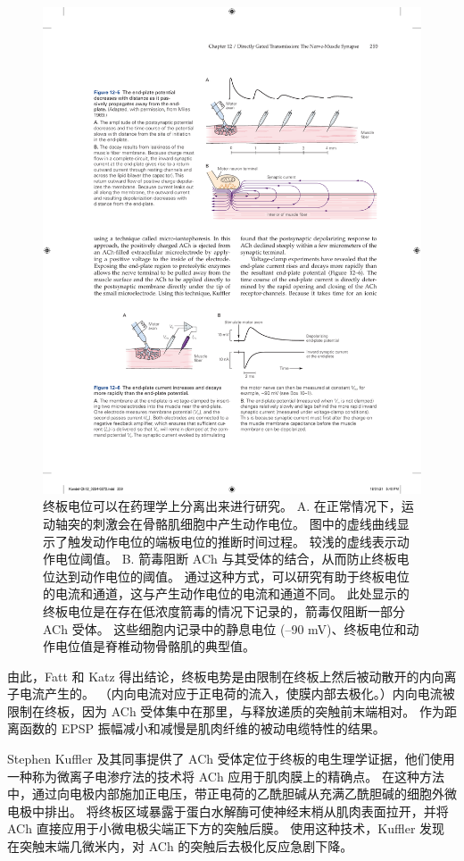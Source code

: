 \begin{figure}[htbp]
	\centering
	\includegraphics[width=0.8\linewidth]{chap12/fig_12_4}
	\caption{终板电位可以在药理学上分离出来进行研究。 A. 在正常情况下，运动轴突的刺激会在骨骼肌细胞中产生动作电位。 图中的虚线曲线显示了触发动作电位的端板电位的推断时间过程。 较浅的虚线表示动作电位阈值。 B. 箭毒阻断 ACh 与其受体的结合，从而防止终板电位达到动作电位的阈值。 通过这种方式，可以研究有助于终板电位的电流和通道，这与产生动作电位的电流和通道不同。 此处显示的终板电位是在存在低浓度箭毒的情况下记录的，箭毒仅阻断一部分 ACh 受体。 这些细胞内记录中的静息电位 (–90 mV)、终板电位和动作电位值是脊椎动物骨骼肌的典型值。}
	\label{fig:12_4}
\end{figure}


由此，Fatt 和 Katz 得出结论，终板电势是由限制在终板上然后被动散开的内向离子电流产生的。 
（内向电流对应于正电荷的流入，使膜内部去极化。）内向电流被限制在终板，因为 ACh 受体集中在那里，与释放递质的突触前末端相对。 
作为距离函数的 EPSP 振幅减小和减慢是肌肉纤维的被动电缆特性的结果。


Stephen Kuffler 及其同事提供了 ACh 受体定位于终板的电生理学证据，他们使用一种称为微离子电渗疗法的技术将 ACh 应用于肌肉膜上的精确点。 
在这种方法中，通过向电极内部施加正电压，带正电荷的乙酰胆碱从充满乙酰胆碱的细胞外微电极中排出。 
将终板区域暴露于蛋白水解酶可使神经末梢从肌肉表面拉开，并将 ACh 直接应用于小微电极尖端正下方的突触后膜。 使用这种技术，Kuffler 发现在突触末端几微米内，对 ACh 的突触后去极化反应急剧下降。


